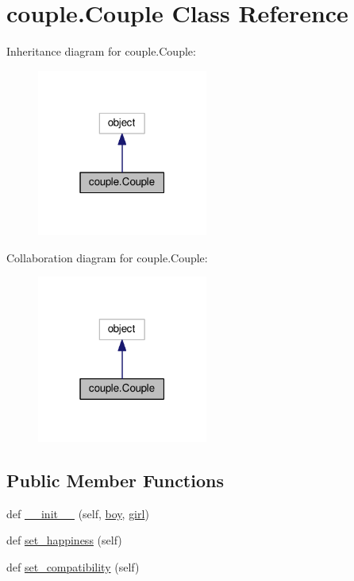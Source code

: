 \hypertarget{classcouple_1_1_couple}{}\section{couple.\+Couple Class Reference}
\label{classcouple_1_1_couple}


Inheritance diagram for couple.\+Couple\+:
\nopagebreak
\begin{figure}[H]
\begin{center}
\leavevmode
\includegraphics[width=159pt]{classcouple_1_1_couple__inherit__graph}
\end{center}
\end{figure}


Collaboration diagram for couple.\+Couple\+:
\nopagebreak
\begin{figure}[H]
\begin{center}
\leavevmode
\includegraphics[width=159pt]{classcouple_1_1_couple__coll__graph}
\end{center}
\end{figure}
\subsection*{Public Member Functions}
\begin{DoxyCompactItemize}
\item 
def \hyperlink{classcouple_1_1_couple_a3cd6b67c48b545c1b51a8c11ac70677c}{\+\_\+\+\_\+init\+\_\+\+\_\+} (self, \hyperlink{classcouple_1_1_couple_a9add8e4c50bcbf4424339df43ed77df6}{boy}, \hyperlink{classcouple_1_1_couple_a99b4aa0aa5cd56aab0edebbba13e31b3}{girl})
\item 
def \hyperlink{classcouple_1_1_couple_a98db0e4bc5aa8bc81c3f5a2b05167c5f}{set\+\_\+happiness} (self)
\item 
def \hyperlink{classcouple_1_1_couple_a6557f9a740d1fc4750f3350e8138b0db}{set\+\_\+compatibility} (self)
\end{DoxyCompactItemize}
